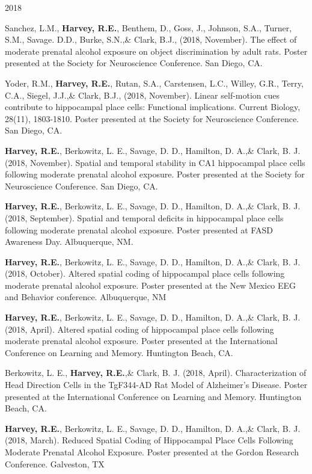 \begin{cventries}
\cventry
    {} %
    {} %
    {} %
    {2018} %
    {
      \begin{cvitems} %
      \setlength\itemsep{0.4em}
        \item {Sanchez, L.M., \textbf{Harvey, R.E.}, Benthem, D., Goss, J., Johnson, S.A., Turner, S.M., Savage. D.D., Burke, S.N.,\& Clark, B.J., (2018, November). The effect of moderate prenatal alcohol exposure on object discrimination by adult rats. Poster presented at the Society for Neuroscience Conference. San Diego, CA.}
        \item {Yoder, R.M., \textbf{Harvey, R.E.}, Rutan, S.A., Carstensen, L.C., Willey, G.R., Terry, C.A., Siegel, J.J.,\& Clark, B.J., (2018, November). Linear self-motion cues contribute to hippocampal place cells: Functional implications. Current Biology, 28(11), 1803-1810. Poster presented at the Society for Neuroscience Conference. San Diego, CA.}
        \item {\textbf{Harvey, R.E.}, Berkowitz, L. E., Savage, D. D., Hamilton, D. A.,\& Clark, B. J. (2018, November). Spatial and temporal stability in CA1 hippocampal place cells following moderate prenatal alcohol exposure. Poster presented at the Society for Neuroscience Conference. San Diego, CA.}
        \item {\textbf{Harvey, R.E.}, Berkowitz, L. E., Savage, D. D., Hamilton, D. A.,\& Clark, B. J. (2018, September). Spatial and temporal deficits in hippocampal place cells following moderate prenatal alcohol exposure. Poster presented at FASD Awareness Day. Albuquerque, NM.}
        \item {\textbf{Harvey, R.E.}, Berkowitz, L. E., Savage, D. D., Hamilton, D. A.,\& Clark, B. J. (2018, October). Altered spatial coding of hippocampal place cells following moderate prenatal alcohol exposure. Poster presented at the New Mexico EEG and Behavior conference. Albuquerque, NM}
        \item {\textbf{Harvey, R.E.}, Berkowitz, L. E., Savage, D. D., Hamilton, D. A.,\& Clark, B. J. (2018, April). Altered spatial coding of hippocampal place cells following moderate prenatal alcohol exposure. Poster presented at the International Conference on Learning and Memory. Huntington Beach, CA.}
        \item {Berkowitz, L. E., \textbf{Harvey, R.E.},\& Clark, B. J. (2018, April). Characterization of Head Direction Cells in the TgF344-AD Rat Model of Alzheimer’s Disease. Poster presented at the International Conference on Learning and Memory. Huntington Beach, CA.}
        \item {\textbf{Harvey, R.E.}, Berkowitz, L. E., Savage, D. D., Hamilton, D. A.,\& Clark, B. J. (2018, March). Reduced Spatial Coding of Hippocampal Place Cells Following Moderate Prenatal Alcohol Exposure. Poster presented at the Gordon Research Conference. Galveston, TX}
      \end{cvitems}
    }
\end{cventries}

